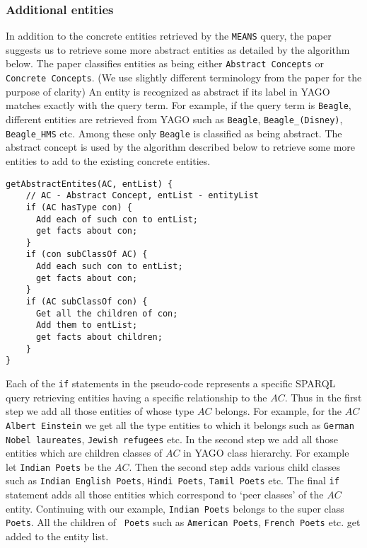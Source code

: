 \documentclass[a4paper,12pt]{report}
\begin{document}
\subsubsection{Additional entities}
In addition to the concrete entities retrieved by the {\tt MEANS}
query, the paper \cite{yagoclust} suggests us to retrieve some more
abstract entities as detailed by the algorithm below. The paper
classifies entities as being either {\tt Abstract Concepts} or {\tt
  Concrete Concepts}. (We use slightly different terminology from the
paper for the purpose of clarity) An entity is recognized as abstract
if its label in YAGO matches exactly with the query term. For example,
if the query term is {\tt Beagle}, different entities are retrieved
from YAGO such as {\tt Beagle}, {\tt Beagle\_(Disney)}, {\tt
  Beagle\_HMS} etc. Among these only {\tt Beagle} is classified as
being abstract. The abstract concept is used by the algorithm
described below to retrieve some more entities to add to the existing
concrete entities. 

\begin{verbatim}
getAbstractEntites(AC, entList) {
    // AC - Abstract Concept, entList - entityList
    if (AC hasType con) {
      Add each of such con to entList;
      get facts about con;
    }
    if (con subClassOf AC) {
      Add each such con to entList;
      get facts about con;
    }
    if (AC subClassOf con) {
      Get all the children of con;
      Add them to entList;
      get facts about children;
    }
}
\end{verbatim}

Each of the {\tt if} statements in the pseudo-code represents a specific
SPARQL query retrieving entities having a specific relationship to the
$AC$. Thus in the first step we add all those entities of whose type
$AC$ belongs. For example, for the $AC$ {\tt Albert Einstein} we get
all the type entities to which it belongs such as {\tt German Nobel
  laureates}, {\tt Jewish refugees} etc. In the second step we add all
those entities which are children classes of $AC$ in YAGO class
hierarchy. For example let {\tt Indian Poets} be the $AC$. Then the
second step adds various child classes such as {\tt Indian English
  Poets}, {\tt Hindi Poets}, {\tt Tamil Poets} etc. The final {\tt if}
statement adds all those entities which correspond to `peer classes'
of the $AC$ entity. Continuing with our example, {\tt Indian Poets}
belongs to the super class {\tt Poets}. All the children of {\tt
  Poets} such as {\tt American Poets}, {\tt French Poets} etc. get
added to the entity list.
\end{document}
